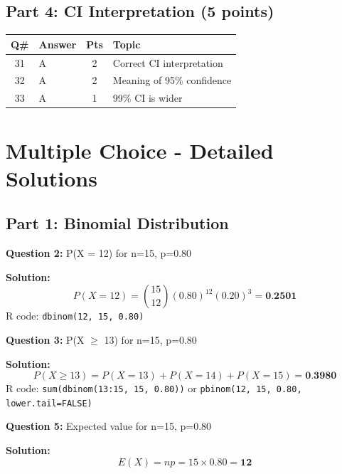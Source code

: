 \documentclass[11pt]{article}
\begin{document}
\subsection*{Part 4: CI Interpretation (5 points)}

\begin{table}[h]
\begin{tabular}{clcp{8cm}}
\toprule
\textbf{Q\#} & \textbf{Answer} & \textbf{Pts} & \textbf{Topic} \\
\midrule
31 & \textcolor{correctgreen}{A} & 2 & Correct CI interpretation \\
32 & \textcolor{correctgreen}{A} & 2 & Meaning of 95\% confidence \\
33 & \textcolor{correctgreen}{A} & 1 & 99\% CI is wider \\
\bottomrule
\end{tabular}
\end{table}

\newpage

\section*{Multiple Choice - Detailed Solutions}

\subsection*{Part 1: Binomial Distribution}

\textbf{Question 2:} P(X = 12) for n=15, p=0.80

\textcolor{correctgreen}{\textbf{Solution:}}
$$P(X=12) = \binom{15}{12}(0.80)^{12}(0.20)^3 = \textbf{0.2501}$$
R code: \texttt{dbinom(12, 15, 0.80)}

\vspace{0.5cm}

\textbf{Question 3:} P(X $\geq$ 13) for n=15, p=0.80

\textcolor{correctgreen}{\textbf{Solution:}}
$$P(X \geq 13) = P(X=13) + P(X=14) + P(X=15) = \textbf{0.3980}$$
R code: \texttt{sum(dbinom(13:15, 15, 0.80))} or \texttt{pbinom(12, 15, 0.80, lower.tail=FALSE)}

\vspace{0.5cm}

\textbf{Question 5:} Expected value for n=15, p=0.80

\textcolor{correctgreen}{\textbf{Solution:}}
$$E(X) = np = 15 \times 0.80 = \textbf{12}$$

\vspace{0.5cm}
\end{document}
